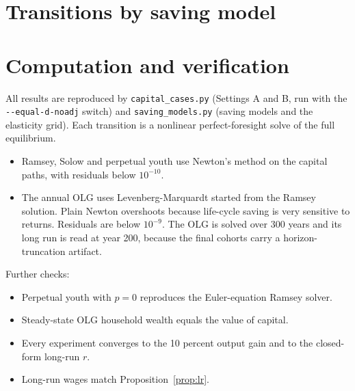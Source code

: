 \documentclass[11pt]{article}
\newcommand{\e}{\varepsilon}
\begin{document}
\appendix
\section{Transitions by saving model}
\begin{table}[h]\centering\tiny
\caption{Transitions by saving model, Setting B, $\e=1.5$. ``Long run'' $r$ is the closed form of Proposition~\ref{prop:saving}.}

\end{table}

\section{Computation and verification}
All results are reproduced by \texttt{capital\_cases.py} (Settings A and B, run with the
\texttt{-{}-equal-d-noadj} switch) and \texttt{saving\_models.py} (saving models and the
elasticity grid). Each transition is a nonlinear perfect-foresight solve of the full
equilibrium.
\begin{itemize}
\item Ramsey, Solow and perpetual youth use Newton's method on the capital paths, with
residuals below $10^{-10}$.
\item The annual OLG uses Levenberg-Marquardt started from the Ramsey solution. Plain
Newton overshoots because life-cycle saving is very sensitive to returns. Residuals are
below $10^{-9}$. The OLG is solved over 300 years and its long run is read at year 200, because the final
cohorts carry a horizon-truncation artifact.
\end{itemize}
Further checks:
\begin{itemize}
\item Perpetual youth with $p=0$ reproduces the Euler-equation Ramsey solver.
\item Steady-state OLG household wealth equals the value of capital.
\item Every experiment converges to the 10 percent output gain and to the closed-form long-run $r$.
\item Long-run wages match Proposition~\ref{prop:lr}.
\end{itemize}

\begin{table}[h]\centering\tiny
\caption{Verification, saving models (largest errors).}

\end{table}
\end{document}
